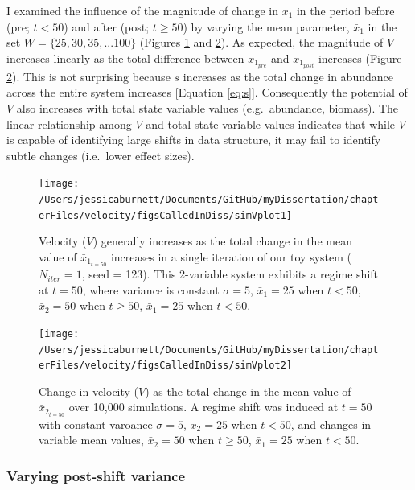 \documentclass[12pt,twoside,openany]{reedthesis}
\begin{document}
I examined the influence of the magnitude of change in \(x_1\) in the period before (pre; \(t <50\)) and after (post; \(t \geq 50\)) by varying the mean parameter, \(\bar{x}_1\) in the set \(W=\{25,30,35,...100 \}\) (Figures \ref{fig:simVplot1} and \ref{fig:simVplot2}). As expected, the magnitude of \(V\) increases linearly as the total difference between \(\bar{x}_{1_{pre}}\) and \(\bar{x}_{1_{post}}\) increases (Figure \ref{fig:simVplot2}). This is not surprising because \(s\) increases as the total change in abundance across the entire system increases {[}Equation \eqref{eq:s}{]}. Consequently the potential of \(V\) also increases with total state variable values (e.g.~abundance, biomass). The linear relationship among \(V\) and total state variable values indicates that while \(V\) is capable of identifying large shifts in data structure, it may fail to identify subtle changes (i.e.~lower effect sizes).
\begin{figure}[bth]

{\centering \texttt{[image: /Users/jessicaburnett/Documents/GitHub/myDissertation/chapterFiles/velocity/figsCalledInDiss/simVplot1]} 

}

\caption{Velocity ($V$) generally increases as the total change in the mean value of $\bar{x}_{1_{t=50}}$ increases in a single iteration of our toy system ($N_{iter}=1$, seed = 123). This 2-variable system exhibits a regime shift at $t=50$, where variance is constant $\sigma = 5$, $\bar{x}_1 = 25$ when $t<50$,  $\bar{x}_2=50$ when $t\geq50$, $\bar{x}_1 = 25$ when $t <50$.}\label{fig:simVplot1}
\end{figure}
\begin{figure}[bth]

{\centering \texttt{[image: /Users/jessicaburnett/Documents/GitHub/myDissertation/chapterFiles/velocity/figsCalledInDiss/simVplot2]} 

}

\caption{Change in velocity ($V$) as the total change in the mean value of $\bar{x}_{2_{t=50}}$ over 10,000 simulations. A regime shift was induced at $t=50$ with constant varoance $\sigma = 5$, $\bar{x}_2 = 25$ when $t<50$,  and changes in variable mean values, $\bar{x}_2 = 50$ when $t \geq 50$, $\bar{x}_1 = 25$ when $t<50$.}\label{fig:simVplot2}
\end{figure}
\hypertarget{varying-post-shift-variance}{%
\subsubsection{Varying post-shift variance}\label{varying-post-shift-variance}}
\end{document}
